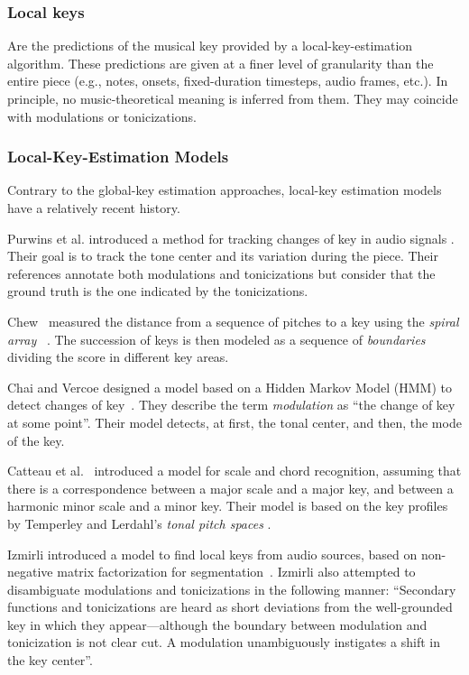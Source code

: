 \subsubsection{Local keys}
Are the predictions of the musical key provided by a local-key-estimation algorithm. 
These predictions are given at a finer level of granularity than the entire piece (e.g., notes, onsets, fixed-duration timesteps, audio frames, etc.).
In principle, no music-theoretical meaning is inferred from them. They may coincide with modulations or tonicizations.

\subsubsection{Local-Key-Estimation Models}\label{ssec:localkey}

Contrary to the global-key estimation approaches, local-key estimation models have a relatively recent history.

Purwins et al. introduced a method for tracking changes of key in audio signals %
\cite{purwins_new_2000}. 
Their goal is to track the tone center and its variation during the piece. Their references annotate both modulations and tonicizations but consider that the ground truth is the one indicated by the tonicizations.

Chew~\cite{chew2002key} measured the distance from a sequence of pitches to a key using the \emph{spiral array} ~\cite{Chew2000TowardsAM}. 
The succession of keys is then modeled as a sequence of \emph{boundaries} dividing the score in different key areas.

Chai and Vercoe designed a model based on a Hidden Markov Model (HMM) to detect changes of key~\cite{chai_detection_2005}. 
They describe the term \emph{modulation} as ``the change of key at some point''. 
Their model detects, at first, the tonal center, and then, the mode of the key.

Catteau et al.~\cite{Catteau07tonalkey} introduced a model for scale and chord recognition, assuming that there is a correspondence between a major scale and a major key, and between a harmonic minor scale and a minor key. Their model is based on the key profiles by Temperley \cite{Temperley99:tonality} and Lerdahl's \emph{tonal pitch spaces} \cite{lerdahl88tps}.

Izmirli introduced a model to find local keys from audio sources, based on non-negative matrix factorization for segmentation~\cite{izmirli_localized_2007}. 
Izmirli also attempted to disambiguate modulations and tonicizations in the following manner: ``Secondary functions and tonicizations are heard as short deviations from the well-grounded key in which they appear---although the boundary between modulation and tonicization is not clear cut. A modulation unambiguously instigates a shift in the key center''. 

